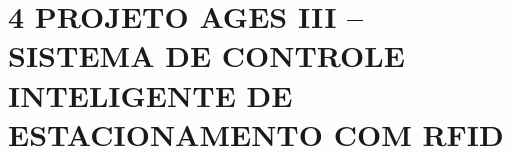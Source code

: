 \hypertarget{__RefHeading___Toc4797_3118176633}{}
\hypertarget{_Toc45627148}{}
\chapter*{4 PROJETO AGES III – SISTEMA DE CONTROLE INTELIGENTE DE ESTACIONAMENTO COM RFID}
\label{ages-iii:text-h-0074}
